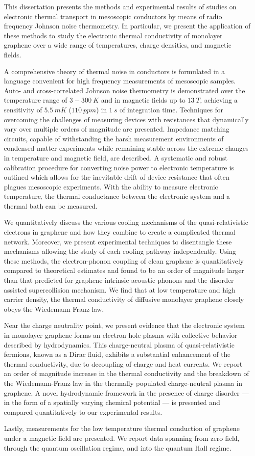 This dissertation presents the methods and experimental results of studies on electronic thermal transport in mesoscopic conductors by means of radio frequency Johnson noise thermometry. In particular, we present the application of these methods to study the electronic thermal conductivity of monolayer graphene over a wide range of temperatures, charge densities, and magnetic fields.

A comprehensive theory of thermal noise in conductors is formulated in a language convenient for high frequency measurements of mesoscopic samples. Auto- and cross-correlated Johnson noise thermometry is demonstrated over the temperature range of $3-300~K$ and in magnetic fields up to $13~T$, achieving a sensitivity of $5.5~mK$ ($110~ppm$) in $1~s$ of integration time. Techniques for overcoming the challenges of measuring devices with resistances that dynamically vary over multiple orders of magnitude are presented. Impedance matching circuits, capable of withstanding the harsh measurement environments of condensed matter experiments while remaining stable across the extreme changes in temperature and magnetic field, are described. A systematic and robust calibration procedure for converting noise power to electronic temperature is outlined which allows for the inevitable drift of device resistance that often plagues mesoscopic experiments. With the ability to measure electronic temperature, the thermal conductance between the electronic system and a thermal bath can be measured. 

We quantitatively discuss the various cooling mechanisms of the quasi-relativistic electrons in graphene and how they combine to create a complicated thermal network. Moreover, we present experimental techniques to disentangle these mechanisms allowing the study of each cooling pathway independently. Using these methods, the electron-phonon coupling of clean graphene is quantitatively compared to theoretical estimates and found to be an order of magnitude larger than that predicted for graphene intrinsic acoustic-phonons and the disorder-assisted supercollision mechanism. We find that at low temperature and high carrier density, the thermal conductivity of diffusive monolayer graphene closely obeys the Wiedemann-Franz law. 

Near the charge neutrality point, we present evidence that the electronic system in monolayer graphene forms an electron-hole plasma with collective behavior described by hydrodynamics. This charge-neutral plasma of quasi-relativistic fermions, known as a Dirac fluid, exhibits a substantial enhancement of the thermal conductivity, due to decoupling of charge and heat currents. We report an order of magnitude increase in the thermal conductivity and the breakdown of the Wiedemann-Franz law in the thermally populated charge-neutral plasma in graphene. A novel hydrodynamic framework in the presence of charge disorder --- in the form of a spatially varying chemical potential --- is presented and compared quantitatively to our experimental results.

Lastly, measurements for the low temperature thermal conduction of graphene under a magnetic field are presented. We report data spanning from zero field, through the quantum oscillation regime, and into the quantum Hall regime.